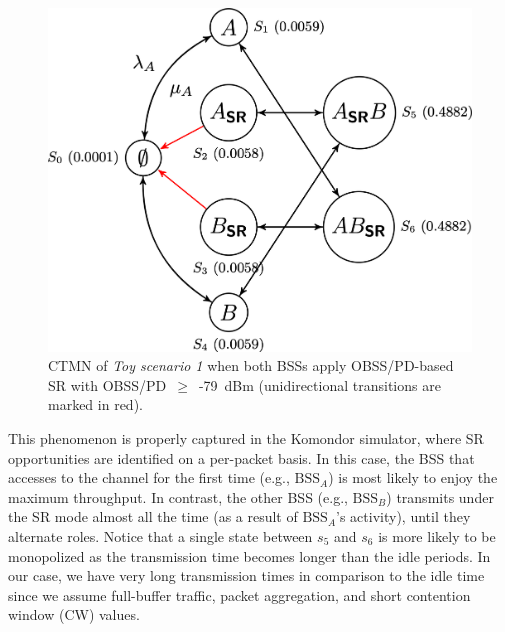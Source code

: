 \documentclass{article}
\begin{document}
\begin{figure}[ht!]
	\centering    
	\includegraphics[width=.6\textwidth]{ctmn_toy_scenario_1c}
	\caption{CTMN of \emph{Toy scenario 1} when both BSSs apply OBSS/PD-based SR with OBSS/PD~$\geq$~-79~dBm (unidirectional transitions are marked in red).}
	\label{fig:ctmn_toy_scenario_1c}
\end{figure}

This phenomenon is properly captured in the Komondor simulator, where SR opportunities are identified on a per-packet basis. In this case, the BSS that accesses to the channel for the first time (e.g., $\text{BSS}_A$) is most likely to enjoy the maximum throughput. In contrast, the other BSS (e.g., $\text{BSS}_B$) transmits under the SR mode almost all the time (as a result of $\text{BSS}_A$'s activity), until they alternate roles. Notice that a single state between $s_5$  and $s_6$ is more likely to be monopolized as the transmission time becomes longer than the idle periods. In our case, we have very long transmission times in comparison to the idle time since we assume full-buffer traffic, packet aggregation, and short contention window (CW) values.

\end{document}
